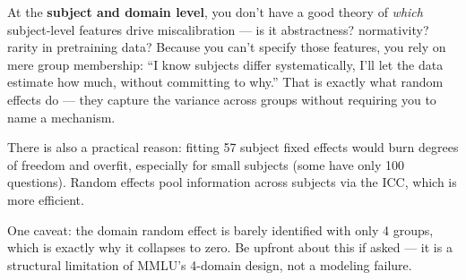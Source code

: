 \documentclass[aspectratio=169,11pt]{beamer}
\begin{document}
{  At the \textbf{subject and domain level}, you don't have a good theory of
  \emph{which} subject-level features drive miscalibration --- is it abstractness?
  normativity? rarity in pretraining data? Because you can't specify those features,
  you rely on mere group membership: ``I know subjects differ systematically, I'll
  let the data estimate how much, without committing to why.'' That is exactly what
  random effects do --- they capture the variance across groups without requiring you
  to name a mechanism.

  There is also a practical reason: fitting 57 subject fixed effects would burn
  degrees of freedom and overfit, especially for small subjects (some have only 100
  questions). Random effects pool information across subjects via the ICC, which is
  more efficient.

  One caveat: the domain random effect is barely identified with only 4 groups, which
  is exactly why it collapses to zero. Be upfront about this if asked --- it is a
  structural limitation of MMLU's 4-domain design, not a modeling failure.
}

\end{document}
